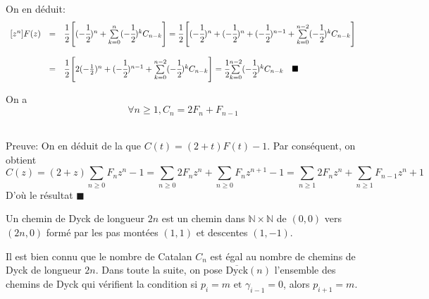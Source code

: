 \text{}\vspace{5pt}\\
On en déduit:
\[
	\begin{array}{c c l}
		[z^n]F(z) & =       & \cfrac{1}{2}\left[(-\cfrac{1}{2})^n + \underset{k=0}{\overset{n}{\sum}}(-\cfrac{1}{2})^k C_{n-k}
			\right]=\cfrac{1}{2}\left[(-\cfrac{1}{2})^n + (-\cfrac{1}{2})^n +(-\cfrac{1}{2})^{n-1} +\underset{k=0}
		{\overset{n-2}{\sum}}(-\cfrac{1}{2})^k C_{n-k}\right]                                                                    \\
		          & \text{} &                                                                                                    \\
		          & =       & \cfrac{1}{2}\left[2(-\frac{1}{2})^n + (-\cfrac{1}{2})^{n-1} +\underset{k=0}{\overset{n-2}{\sum}}(-
			\cfrac{1}{2})^k C_{n-k}\right]=\cfrac{1}{2}\underset{k=0}{\overset{n-2}{\sum}}(-\cfrac{1}{2})^k C_{n-k}
		\hspace{10pt}\blacksquare
	\end{array}
\]
\text{}\vspace{5pt}
\begin{proposition}\label{cnfn}
	On a \[\forall n\geq 1, C_{n}=2F_{n}+F_{n-1}\]
\end{proposition}
\text{}\\
Preuve:
On en déduit de la  que $C(t)=(2+t)F(t)-1$. Par conséquent, on obtient
\[C(z)= (2+z)\underset{n\geq0}{\sum}F_{n}z^n -1=\sum_{n\geq 0}2F_{n}z^n+\sum_{n\geq 0} F_{n}
	z^{n+1}-1=\sum_{n\geq 1}2F_{n}z^n+\sum_{n\geq 1} F_{n-1}z^{n}+1\]
D'où le résultat \hspace{5pt}$\blacksquare$ \vspace{5pt}\\
\begin{definition}
	\begin{rm}
		Un chemin de Dyck de longueur $2n$ est un chemin dans $\mathbb{N}\times \mathbb{N}$ de $(0, 0)$ vers $(2n, 0)$ formé par les pas montées $(1,1)$
		et descentes $(1,-1)$.
	\end{rm}
\end{definition}
Il est bien connu que le nombre de Catalan $C_{n}$ est égal au nombre de chemins de Dyck
de longueur $2n$. Dans toute la suite, on pose $\overline{\text{Dyck}}(n)$ l'ensemble des chemins de Dyck qui
vérifient la condition si $p_{i}=m \text{ et } \gamma_{i-1}=0$, alors  $p_{i+1}=m$.

